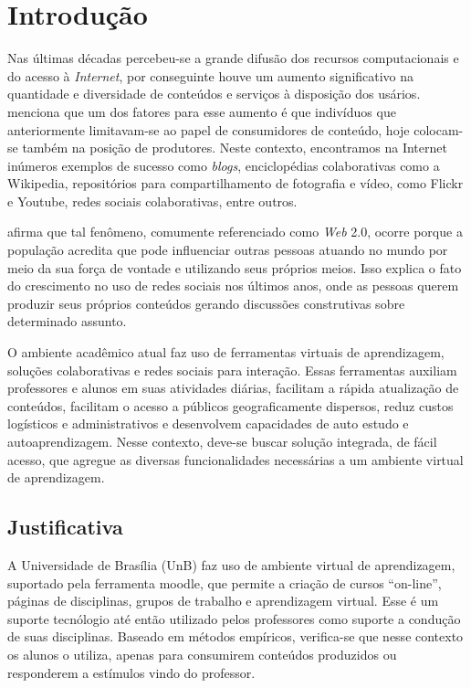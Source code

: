 \chapter{Introdução}
\label{cap-introducao}

Nas últimas décadas percebeu-se a grande difusão dos recursos computacionais e do acesso à \textit{Internet}, por conseguinte houve um aumento significativo na quantidade e diversidade de conteúdos e serviços à disposição dos usários.  menciona que um dos fatores para esse aumento é que indivíduos que anteriormente limitavam-se ao papel de consumidores de conteúdo, hoje colocam-se também na posição de produtores. Neste contexto, encontramos na Internet inúmeros exemplos de sucesso como \textit{blogs}, enciclopédias colaborativas como a Wikipedia, repositórios para compartilhamento de fotografia e vídeo, como Flickr e Youtube, redes sociais colaborativas, entre outros.

 afirma que tal fenômeno, comumente referenciado como \textit{Web} 2.0, ocorre porque a população acredita que pode influenciar outras pessoas atuando no mundo por meio da sua força de vontade e utilizando seus próprios meios. Isso explica o fato do crescimento no uso de redes sociais nos últimos anos, onde as pessoas querem produzir seus próprios conteúdos gerando discussões construtivas sobre determinado assunto.


O ambiente acadêmico atual faz uso de ferramentas virtuais de aprendizagem, soluções colaborativas e redes sociais para interação. Essas ferramentas auxiliam professores e alunos em suas atividades diárias, facilitam a rápida atualização de conteúdos, facilitam o acesso a públicos geograficamente dispersos, reduz custos logísticos e administrativos e desenvolvem capacidades de auto estudo e autoaprendizagem. Nesse contexto, deve-se buscar solução integrada, de fácil acesso, que agregue  as diversas funcionalidades necessárias a um ambiente virtual de aprendizagem.

\section{Justificativa}

A Universidade de Brasília (UnB) faz uso de ambiente virtual de aprendizagem, suportado pela ferramenta moodle, que permite a criação de cursos ``on-line'', páginas de disciplinas, grupos de trabalho e aprendizagem virtual. Esse é um suporte tecnólogio até então utilizado pelos professores como suporte a condução de suas disciplinas. Baseado em métodos empíricos, verifica-se que nesse contexto os alunos o utiliza, apenas para consumirem conteúdos produzidos ou responderem a estímulos vindo do professor.

